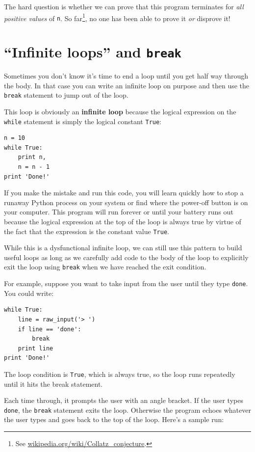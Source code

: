 \documentclass[10pt]{book}
\begin{document}
The hard question is whether we can prove that this program terminates
for \emph{all positive values} of {\tt n}.  So far\footnote{See
  \url{wikipedia.org/wiki/Collatz_conjecture}.}, no one has
been able to prove it \emph{or} disprove it!

\section{``Infinite loops'' and {\tt break}}

Sometimes you don't know it's time to end a loop until you get half
way through the body.  In that case you can write an infinite loop on purpose
and then use the {\tt break} statement to jump out of the loop.

This loop is obviously an {\bf infinite loop} because the logical 
expression on the
{\tt while} statement is simply the logical constant {\tt True}:
\beforeverb
\begin{verbatim}
n = 10
while True:
    print n, 
    n = n - 1
print 'Done!'
\end{verbatim}
\afterverb
%
If you make the mistake and run this code, you will learn quickly how
to stop a runaway Python process on your system or find where the power-off
button is on your computer.  
This program will 
run forever or until your battery runs out 
because the logical expression at the top of the loop 
is always true by virtue of the fact that the expression is the 
constant value {\tt True}.

While this is a dysfunctional infinite loop, we can still use this pattern
to build useful loops as long as we carefully add code to the 
body of the loop to explicitly exit the loop using {\tt break} 
when we have reached 
the exit condition.

For example, suppose you want to take input from the user until they
type {\tt done}.  You could write:

\beforeverb
\begin{verbatim}
while True:
    line = raw_input('> ')
    if line == 'done':
        break
    print line
print 'Done!'
\end{verbatim}
\afterverb
%
The loop condition is {\tt True}, which is always true, so the
loop runs repeatedly until it hits the break statement.

Each time through, it prompts the user with an angle bracket.
If the user types {\tt done}, the {\tt break} statement exits
the loop.  Otherwise the program echoes whatever the user types
and goes back to the top of the loop.  Here's a sample run:
\end{document}
